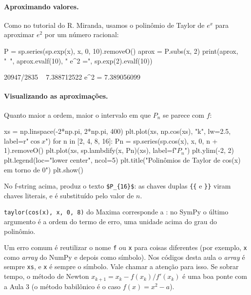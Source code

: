 \paragraph{Aproximando valores.} Como no tutorial do R. Miranda, usamos o polinômio de Taylor de $e^x$ para
aproximar $e^2$ por um número racional:

\begin{entrada}
P = sp.series(sp.exp(x), x, 0, 10).removeO()
aprox = P.subs(x, 2)
print(aprox, "~", aprox.evalf(10), "   e^2 =", sp.exp(2).evalf(10))
\end{entrada}
\begin{saida}
20947/2835 ~ 7.388712522    e^2 = 7.389056099
\end{saida}

\paragraph{Visualizando as aproximações.} Quanto maior a ordem, maior o intervalo em que $P_n$ se parece com $f$:

\begin{entrada}
xs = np.linspace(-2*np.pi, 2*np.pi, 400)
plt.plot(xs, np.cos(xs), "k", lw=2.5, label=r"$\cos x$")
for n in [2, 4, 8, 16]:
    Pn = sp.series(sp.cos(x), x, 0, n + 1).removeO()
    plt.plot(xs, sp.lambdify(x, Pn)(xs), label=f"$P_{{{n}}}$")
plt.ylim(-2, 2)
plt.legend(loc="lower center", ncol=5)
plt.title("Polinômios de Taylor de cos(x) em torno de 0")
plt.show()
\end{entrada}

\begin{observacao}
No f-string acima,  produz o texto \texttt{\$P\_\{16\}\$}: as chaves duplas \texttt{\{\{} e
\texttt{\}\}} viram chaves literais, e  é substituído pelo valor de $n$.
\end{observacao}

\begin{maxima}
\texttt{taylor(cos(x), x, 0, 8)} do Maxima corresponde a : no SymPy o último
argumento é a ordem do termo de erro, uma unidade acima do grau do polinômio.
\end{maxima}

\begin{professor}
Um erro comum é reutilizar o nome \texttt{f} ou \texttt{x} para coisas diferentes (por exemplo, \texttt{x} como
\emph{array} do NumPy e depois como símbolo). Nos códigos desta aula o \emph{array} é sempre \texttt{xs}, e
\texttt{x} é sempre o símbolo. Vale chamar a atenção para isso. Se sobrar tempo, o método de Newton
$x_{k+1}=x_k-f(x_k)/f'(x_k)$ é uma boa ponte com a Aula 3 (o método babilônico é o caso $f(x)=x^2-a$).
\end{professor}

